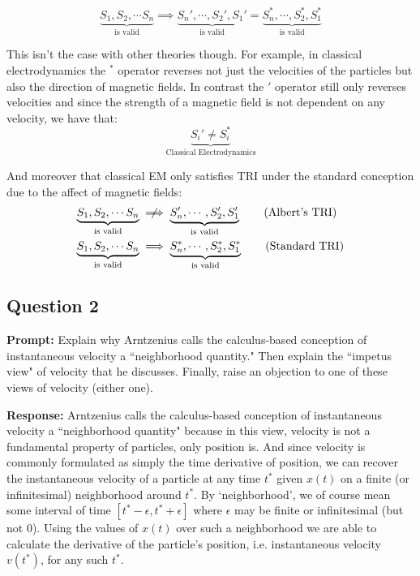 \documentclass{article}
\begin{document}
$$\underbrace{S_1,S_2,\cdots S_n}_{\text{is valid}}\implies\underbrace{S_n',\cdots,S_2',S_1'}_{\text{is valid}}=\underbrace{S_n^*,\cdots,S_2^*,S_1^*}_{\text{is valid}}$$
\smallskip

This isn't the case with other theories though. For example, in classical electrodynamics the $^*$ operator reverses not just the velocities of the particles but also the direction of magnetic fields. In contrast the $'$ operator still only reverses velocities and since the strength of a magnetic field is not dependent on any velocity, we have that:
$$\underbrace{S_i'\not=S_i^*}_{\text{Classical Electrodynamics}}$$
\smallskip

And moreover that classical EM only satisfies TRI under the standard conception due to the affect of magnetic fields:
\begin{align*}
  \underbrace{S_1,S_2,\cdots S_n}_{\text{is valid}}&\centernot\implies\underbrace{S_n',\cdots,S_2',S_1'}_{\text{is valid}}\tag{Albert's TRI}\\
  \underbrace{S_1,S_2,\cdots S_n}_{\text{is valid}}&\implies\underbrace{S_n^*,\cdots,S_2^*,S_1^*}_{\text{is valid}}\tag{Standard TRI}
\end{align*}
\newpage



\subsection*{Question 2}
\noindent\textbf{Prompt:} Explain why Arntzenius calls the calculus-based conception of instantaneous velocity a ``neighborhood quantity." Then explain the ``impetus view" of velocity that he discusses. Finally, raise an objection to one of these views of velocity (either one).
\bigskip

\noindent\textbf{Response:} Arntzenius calls the calculus-based conception of instantaneous velocity a ``neighborhood quantity" because in this view, velocity is not a fundamental property of particles, only position is. And since velocity is commonly formulated as simply the time derivative of position, we can recover the instantaneous velocity of a particle at any time $t^*$ given $x(t)$ on a finite (or infinitesimal) neighborhood around $t^*$. By `neighborhood', we of course mean some interval of time $[t^*-\epsilon,t^*+\epsilon]$ where $\epsilon$ may be finite or infinitesimal (but not 0). Using the values of $x(t)$ over such a neighborhood we are able to calculate the derivative of the particle's position, i.e. instantaneous velocity $v(t^*)$,  for any such $t^*$.
\end{document}
